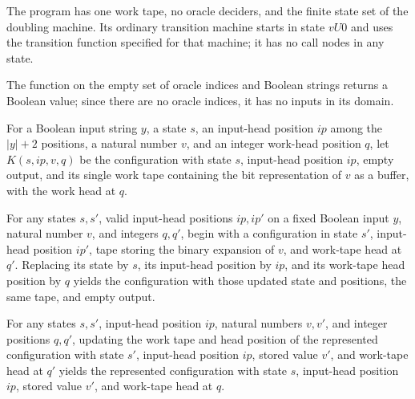 \begin{definition}
\label{Complexity.LogProg.Dbl.prog}
\leanok
{}
The program has one work tape, no oracle deciders, and the finite state set of the
doubling machine. Its ordinary transition machine starts in state $vU0$ and uses the
transition function specified for that machine; it has no call nodes in any state.
\end{definition}

\begin{definition}
\label{Complexity.LogProg.Dbl.o}
\leanok
The function on the empty set of oracle indices and Boolean strings returns a Boolean
value; since there are no oracle indices, it has no inputs in its domain.
\end{definition}

\begin{definition}
\label{Complexity.LogProg.Dbl.K}
\leanok
{}
For a Boolean input string $y$, a state $s$, an input-head position $ip$ among the
$|y|+2$ positions, a natural number $v$, and an integer work-head position $q$, let
$K(s,ip,v,q)$ be the configuration with state $s$, input-head position $ip$, empty
output, and its single work tape containing the bit representation of $v$ as a buffer,
with the work head at $q$.
\end{definition}

\begin{lemma}
\label{Complexity.LogProg.Dbl.xCfg_K}
\leanok
{}
For any states $s,s'$, valid input-head positions $ip,ip'$ on a fixed Boolean input $y$,
natural number $v$, and integers $q,q'$, begin with a configuration in state $s'$,
input-head position $ip'$, tape storing the binary expansion of $v$, and work-tape head
at $q'$. Replacing its state by $s$, its input-head position by $ip$, and its work-tape
head position by $q$ yields the configuration with those updated state and positions,
the same tape, and empty output.
\end{lemma}

\begin{lemma}
\label{Complexity.LogProg.Dbl.regCfg_K}
\leanok
{}
For any states $s,s'$, input-head position $ip$, natural numbers $v,v'$, and integer
positions $q,q'$, updating the work tape and head position of the represented
configuration with state $s'$, input-head position $ip$, stored value $v'$, and
work-tape head at $q'$ yields the represented configuration with state $s$, input-head
position $ip$, stored value $v'$, and work-tape head at $q$.
\end{lemma}

